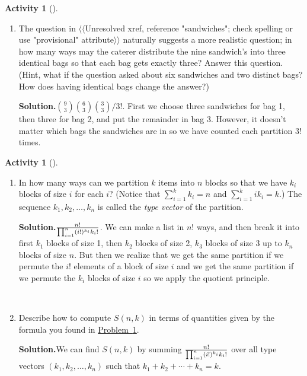 \documentclass[10pt,]{book}
\theoremstyle{plain}
\theoremstyle{definition}
\newtheorem{activity}[project]{Activity}
\numberwithin{equation}{chapter}
\begin{document}
\begin{activity}[]
\begin{enumerate}[label=(\alph*)]
~\par
\item The question in {$\langle\langle$Unresolved xref, reference "sandwiches"; check spelling or use "provisional" attribute$\rangle\rangle$} naturally suggests a more realistic question; in how many ways may the caterer distribute the nine sandwich's into three identical bags so that each bag gets exactly three? Answer this question. (Hint, what if the question asked about six sandwiches and two distinct bags? How does having identical bags change the answer?)%
\par\medskip\noindent%
\textbf{Solution.}\quad \({9\choose 3}{6\choose 3}{3\choose 3}/3!\). First we choose three sandwiches for bag 1, then three for bag 2, and put the remainder in bag 3. However, it doesn't matter which bags the sandwiches are in so we have counted each partition \(3!\) times.%

\end{enumerate}
\end{activity}
\begin{activity}[]\label{partitionsgivenpartsize}
~\par
\begin{enumerate}[label=(\alph*)]
 \item In how many ways can we partition \(k\) items into \(n\) blocks so that we have \(k_i\) blocks of size \(i\) for each \(i\)? (Notice that \(\sum_{i=1}^k k_i = n\) and \(\sum_{i=1}^k ik_i = k\).) The sequence \(k_1,k_2,\ldots,k_n\) is called the \emph{type vector} of the partition.%
\par\medskip\noindent%
\textbf{Solution.}\quad \(n!\over \prod_{i=1}^n (i!)^{k_i}{k_i!}\). We can make a list in \(n!\) ways, and then break it into first \(k_1\) blocks of size 1, then \(k_2\) blocks of size 2, \(k_3\) blocks of size 3 up to \(k_n\) blocks of size \(n\). But then we realize that we get the same partition if we permute the \(i!\) elements of a block of size \(i\) and we get the same partition if we permute the \(k_i\) blocks of size \(i\) so we apply the quotient principle.%

~\par
\item Describe how to compute \(S(n,k)\) in terms of quantities given by the formula you found in \hyperref[partitionsgivenpartsize]{Problem~\ref{partitionsgivenpartsize}}.%
\par\medskip\noindent%
\textbf{Solution.}\quad We can find \(S(n,k)\) by summing \(n!\over \prod_{i=1}^n
(i!)^{k_i}{k_i!}\) over all type vectors \((k_1,k_2,\ldots,k_n)\) such that \(k_1+k_2+\cdots+k_n=k\).%

\end{enumerate}
\end{activity}
\end{document}
